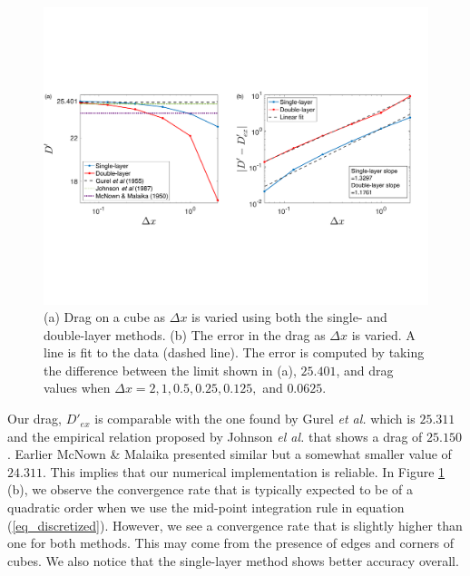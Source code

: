 \begin{figure}[ht]
	\begin{center}
		\vspace{0.2cm}
		
		\includegraphics[scale=0.45]{figures/fig_compare_drag_error}
		\vspace{0.2cm}
	
	\caption{(a) Drag on a cube as $\Delta x$ is varied using both the single- and double-layer methods. (b) The error in the drag as $\Delta x$ is varied. A line is fit to the data (dashed line). The error is computed by taking the difference between the limit shown in (a), $25.401$, and drag values when $\Delta x = 2, 1, 0.5,   0.25,  0.125,$ and $0.0625$.}
	\label{fig_drag_compare}
\end{center}
\end{figure}
Our drag, $D'_{ex}$ is comparable with the one found by Gurel {\it{et al.}} \cite{gurel_studies_1955} which is $25.311$ and the empirical relation proposed by Johnson {\it{el al.}}  \cite{johnson_drag_1987} that shows a drag of $25.150$. Earlier McNown \& Malaika \cite{mcnown_effects_1950} presented similar but a somewhat smaller value of $24.311$. 
This implies that our numerical implementation is reliable. In Figure \ref{fig_drag_compare} (b),
we observe the convergence rate that is typically expected to be of a quadratic order when we use the mid-point integration rule in equation (\ref{eq_discretized}). However, we see a convergence rate that is slightly higher than one for both methods. This may come from the presence of edges and corners of cubes. We also notice that the single-layer method shows better accuracy overall.
